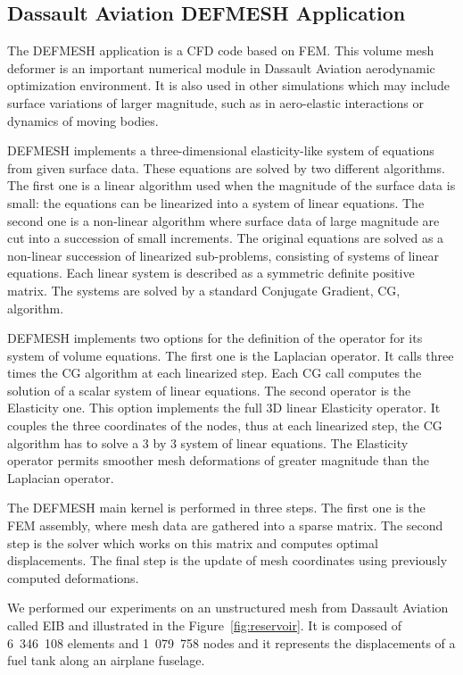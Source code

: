 \documentclass[10pt]{IOS-Book-Article}
\begin{document}
\subsection{Dassault Aviation DEFMESH Application}
The DEFMESH application is a CFD code based on FEM.
This volume mesh deformer is an important numerical module in Dassault Aviation aerodynamic optimization environment.
It is also used in other simulations which may include surface variations of larger magnitude, such as in aero-elastic interactions or dynamics of moving bodies.

DEFMESH implements a three-dimensional elasticity-like system of equations from given surface data.
These equations are solved by two different algorithms.
The first one is a linear algorithm used when the magnitude of the surface data is small: the equations can be linearized into a system of linear equations.
The second one is a non-linear algorithm where surface data of large magnitude are cut into a succession of small increments.
The original equations are solved as a non-linear succession of linearized sub-problems, consisting of systems of linear equations.
Each linear system is described as a symmetric definite positive matrix.
The systems are solved by a standard Conjugate Gradient, CG, algorithm.

DEFMESH implements two options for the definition of the operator for its system of volume equations.
The first one is the Laplacian operator. It calls three times the CG algorithm at each linearized step.
Each CG call computes the solution of a scalar system of linear equations.
The second operator is the Elasticity one. This option implements the full 3D linear Elasticity operator.
It couples the three coordinates of the nodes, thus at each linearized step, the CG algorithm has to solve a 3 by 3 system of linear equations.
The Elasticity operator permits smoother mesh deformations of greater magnitude than the Laplacian operator.

The DEFMESH main kernel is performed in three steps.
The first one is the FEM assembly, where mesh data are gathered into a sparse matrix.
The second step is the solver which works on this matrix and computes optimal displacements.
The final step is the update of mesh coordinates using previously computed deformations.

We performed our experiments on an unstructured mesh from Dassault Aviation called EIB and illustrated in the Figure~\ref{fig:reservoir}.
It is composed of 6~346~108 elements and 1~079~758 nodes and it represents the displacements of a fuel tank along an airplane fuselage.
\end{document}
